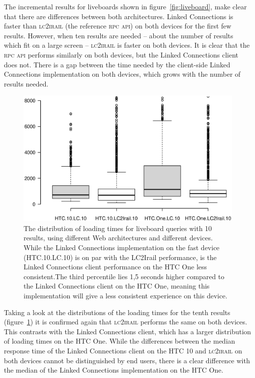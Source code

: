 \documentclass[twocolumn]{phdsymp} %
\begin{document}
The incremental results for liveboards shown in figure~\ref{fig:liveboard}, make clear that there are differences between both architectures. Linked Connections is faster than \textsc{lc2irail} (the reference \textsc{rpc} \textsc{api}) on both devices for the first few results. However, when ten results are needed – about the number of results which fit on a large screen – \textsc{lc2irail} is faster on both devices. It is clear that the \textsc{rpc} \textsc{api} performs similarly on both devices, but the Linked Connections client does not. There is a gap between the time needed by the client-side Linked Connections implementation on both devices, which grows with the number of results needed.

\begin{figure}[ht]
	\begin{center}
		\includegraphics[trim=3cm 4cm 0 0, width=.50\textwidth]{images/boxplot_liveboards_10.eps}
		\caption{\label{fig:liveboardboxplot} The distribution of loading times for liveboard queries with 10 results, using different Web architectures and different devices. While the Linked Connections implementation on the fast device (HTC.10.LC.10) is on par with the LC2Irail performance, is the Linked Connections client performance on the HTC One less consistent.The third percentile lies 1,5 seconds higher compared to the Linked Connections client on the HTC One, meaning this implementation will give a less consistent experience on this device.  }
	\end{center}
\end{figure}

Taking a look at the distributions of the loading times for the tenth results (figure~\ref{fig:liveboardboxplot}) it is confirmed again that \textsc{lc2irail} performs the same on both devices. This contrasts with the Linked Connections client, which has a larger distribution of loading times on the HTC One. While the differences between the median response time of the Linked Connections client on the HTC 10 and \textsc{lc2irail} on both devices cannot be distinguished by end users, there is a clear difference with the median of the Linked Connections implementation on the HTC One.
\end{document}
